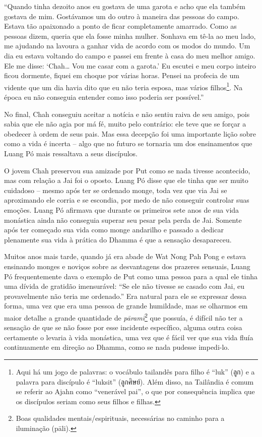 ``Quando tinha dezoito anos eu gostava de uma garota e acho que ela
também gostava de mim. Gostávamos um do outro à maneira das pessoas do
campo. Estava tão apaixonado a ponto de ficar completamente amarrado.
Como as pessoas dizem, queria que ela fosse minha mulher. Sonhava em
tê-la ao meu lado, me ajudando na lavoura a ganhar vida de acordo com os
modos do mundo. Um dia eu estava voltando do campo e passei em frente à
casa do meu melhor amigo. Ele me disse: `Chah\ldots{} Vou me casar com a
garota.' Eu escutei e meu corpo inteiro ficou dormente, fiquei em choque
por várias horas. Pensei na profecia de um vidente que um dia havia dito
que eu não teria esposa, mas vários filhos\footnote{Aqui há um jogo de
  palavras: o vocábulo tailandês para filho é ``luk'' (ลูก) e a palavra
  para discípulo é ``luksit'' (ลูกศิษย์). Além disso, na Tailândia é
  comum se referir ao Ajahn como ``venerável pai'', o que por
  consequência implica que os discípulos seriam como seus filhos e
  filhas.}. Na época eu não conseguia entender como isso poderia ser
possível.''

No final, Chah conseguiu aceitar a notícia e não sentiu raiva de seu
amigo, pois sabia que ele não agia por má fé, muito pelo contrário: ele
teve que se forçar a obedecer à ordem de seus pais. Mas essa decepção
foi uma importante lição sobre como a vida é incerta -- algo que no
futuro se tornaria um dos ensinamentos que Luang Pó mais ressaltava a
seus discípulos.

O jovem Chah preservou sua amizade por Put como se nada tivesse
acontecido, mas com relação a Jai foi o oposto. Luang Pó disse que ele
tinha que ser muito cuidadoso -- mesmo após ter se ordenado monge, toda
vez que via Jai se aproximando ele corria e se escondia, por medo de não
conseguir controlar suas emoções. Luang Pó afirmava que durante os
primeiros sete anos de sua vida monástica ainda não conseguia superar
seu pesar pela perda de Jai. Somente após ter começado sua vida como
monge andarilho e passado a dedicar plenamente sua vida à prática do
Dhamma é que a sensação desapareceu.

Muitos anos mais tarde, quando já era abade de Wat Nong Pah Pong e
estava ensinando monges e noviços sobre as desvantagens dos prazeres
sensuais, Luang Pó frequentemente dava o exemplo de Put como uma pessoa
para a qual ele tinha uma dívida de gratidão imensurável: ``Se ele não
tivesse se casado com Jai, eu provavelmente não teria me ordenado.'' Era
natural para ele se expressar dessa forma, uma vez que era uma pessoa de
grande humildade, mas se olharmos em maior detalhe a grande quantidade
de \emph{pāramī}\footnote{Boas qualidades mentais/espirituais,
  necessárias no caminho para a iluminação (pāli).} que possuía, é
difícil não ter a sensação de que se não fosse por esse incidente
específico, alguma outra coisa certamente o levaria à vida monástica,
uma vez que é fácil ver que sua vida fluía continuamente em direção ao
Dhamma, como se nada pudesse impedi-lo.

